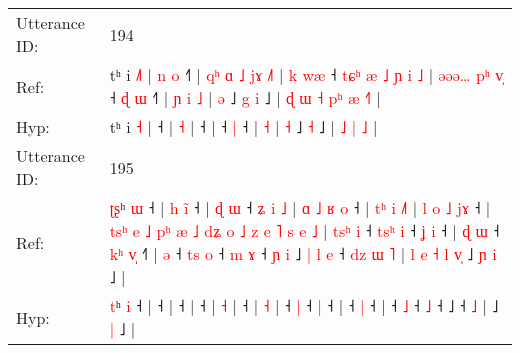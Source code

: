 \documentclass[10pt]{article}
\DeclareRobustCommand{\hl}[1]{{\textcolor{red}{#1}}}
\begin{document}
\begin{longtable}{ll}
Utterance ID: & 194 \\
Ref: & tʰ i \hl{˩}\hl{˥} |\hl{ }\hl{n}\hl{ }\hl{o} ˧\hl{˥} |\hl{ }\hl{q}\hl{ʰ}\hl{ }\hl{ɑ}\hl{ }\hl{˩}\hl{ }\hl{j}\hl{ɤ} \hl{˩}\hl{˥} |\hl{ }\hl{k}\hl{ }\hl{w}\hl{æ} ˧\hl{ }\hl{t}\hl{ɕ}\hl{ʰ}\hl{ }\hl{æ}\hl{ }\hl{˩}\hl{ }\hl{ɲ}\hl{ }\hl{i}\hl{ }\hl{˩} |\hl{ }\hl{ə}\hl{ə}\hl{ə}\hl{…}\hl{ }\hl{p}\hl{ʰ}\hl{ }\hl{v}\hl{̩} ˧\hl{ }\hl{ɖ} \hl{ɯ} ˧\hl{˥} |\hl{ }\hl{ɲ}\hl{ }\hl{i} \hl{˩} | \hl{ə} ˩\hl{ }\hl{g} \hl{i} ˩ |\hl{ }\hl{ɖ}\hl{ }\hl{ɯ}\hl{ }\hl{˧} \hl{p}\hl{ʰ} \hl{æ} \hl{˧}\hl{˥} |
 \\
Hyp: & tʰ i \hl{}\hl{˧} |\hl{}\hl{}\hl{}\hl{} ˧\hl{} |\hl{}\hl{}\hl{}\hl{}\hl{}\hl{}\hl{}\hl{}\hl{}\hl{} \hl{}\hl{˧} |\hl{}\hl{}\hl{}\hl{}\hl{} ˧\hl{}\hl{}\hl{}\hl{}\hl{}\hl{}\hl{}\hl{}\hl{}\hl{}\hl{}\hl{}\hl{}\hl{} |\hl{}\hl{}\hl{}\hl{}\hl{}\hl{}\hl{}\hl{}\hl{}\hl{}\hl{} ˧\hl{}\hl{} \hl{|} ˧\hl{} |\hl{}\hl{}\hl{}\hl{} \hl{˧} | \hl{˧} ˩\hl{}\hl{} \hl{˧} ˩ |\hl{}\hl{}\hl{}\hl{}\hl{}\hl{} \hl{}\hl{˩} \hl{|} \hl{}\hl{˩} |
 \\
\midrule
Utterance ID: & 195 \\
Ref: & \hl{ʈ}\hl{ʂ}ʰ \hl{ɯ} ˧ |\hl{ }\hl{h}\hl{ }\hl{i}\hl{̃} ˧ |\hl{ }\hl{ɖ}\hl{ }\hl{ɯ} ˧\hl{ }\hl{ʑ}\hl{ }\hl{i}\hl{ }\hl{˩} |\hl{ }\hl{ɑ}\hl{ }\hl{˩}\hl{ }\hl{ʁ}\hl{ }\hl{o} ˧ |\hl{ }\hl{t}\hl{ʰ}\hl{ }\hl{i} \hl{˩}\hl{˥} |\hl{ }\hl{l}\hl{ }\hl{o}\hl{ }\hl{˩}\hl{ }\hl{j}\hl{ɤ} ˧ |\hl{ }\hl{t}\hl{s}\hl{ʰ}\hl{ }\hl{e}\hl{ }\hl{˩}\hl{ }\hl{p}\hl{ʰ}\hl{ }\hl{æ}\hl{ }\hl{˩}\hl{ }\hl{d}\hl{ʑ}\hl{ }\hl{o}\hl{ }\hl{˩}\hl{ }\hl{z}\hl{ }\hl{e}\hl{ }\hl{˥}\hl{ }\hl{s}\hl{ }\hl{e} \hl{˩} |\hl{ }\hl{t}\hl{s}\hl{ʰ}\hl{ }\hl{i} ˧\hl{ }\hl{t}\hl{s}\hl{ʰ} \hl{i} ˧\hl{ }\hl{ʝ} \hl{i} ˧ |\hl{ }\hl{ɖ}\hl{ }\hl{ɯ} ˧\hl{ }\hl{k}\hl{ʰ} \hl{v}\hl{̩} ˧\hl{˥} |\hl{ }\hl{ə} ˧\hl{ }\hl{t}\hl{s} \hl{o} ˧\hl{ }\hl{m} \hl{ɤ} ˧\hl{ }\hl{ɲ}\hl{ }\hl{i} ˩\hl{ }\hl{|}\hl{ }\hl{l}\hl{ }\hl{e} ˧\hl{ }\hl{d}\hl{z}\hl{ }\hl{ɯ} \hl{˥} |\hl{ }\hl{l}\hl{ }\hl{e}\hl{ }\hl{˧}\hl{ }\hl{l}\hl{ }\hl{v}\hl{̩} ˩\hl{ }\hl{ɲ} \hl{i} ˩ |
 \\
Hyp: & \hl{}\hl{t}ʰ \hl{i} ˧ |\hl{}\hl{}\hl{}\hl{}\hl{} ˧ |\hl{}\hl{}\hl{}\hl{} ˧\hl{}\hl{}\hl{}\hl{}\hl{}\hl{} |\hl{}\hl{}\hl{}\hl{}\hl{}\hl{}\hl{}\hl{} ˧ |\hl{}\hl{}\hl{}\hl{}\hl{} \hl{}\hl{˧} |\hl{}\hl{}\hl{}\hl{}\hl{}\hl{}\hl{}\hl{}\hl{} ˧ |\hl{}\hl{}\hl{}\hl{}\hl{}\hl{}\hl{}\hl{}\hl{}\hl{}\hl{}\hl{}\hl{}\hl{}\hl{}\hl{}\hl{}\hl{}\hl{}\hl{}\hl{}\hl{}\hl{}\hl{}\hl{}\hl{}\hl{}\hl{}\hl{}\hl{}\hl{}\hl{} \hl{˧} |\hl{}\hl{}\hl{}\hl{}\hl{}\hl{} ˧\hl{}\hl{}\hl{}\hl{} \hl{|} ˧\hl{}\hl{} \hl{|} ˧ |\hl{}\hl{}\hl{}\hl{} ˧\hl{}\hl{}\hl{} \hl{}\hl{|} ˧\hl{} |\hl{}\hl{} ˧\hl{}\hl{}\hl{} \hl{˩} ˧\hl{}\hl{} \hl{˩} ˧\hl{}\hl{}\hl{}\hl{} ˩\hl{}\hl{}\hl{}\hl{}\hl{}\hl{} ˧\hl{}\hl{}\hl{}\hl{}\hl{} \hl{˩} |\hl{}\hl{}\hl{}\hl{}\hl{}\hl{}\hl{}\hl{}\hl{}\hl{}\hl{} ˩\hl{}\hl{} \hl{|} ˩ |

\end{longtable}
\end{document}
